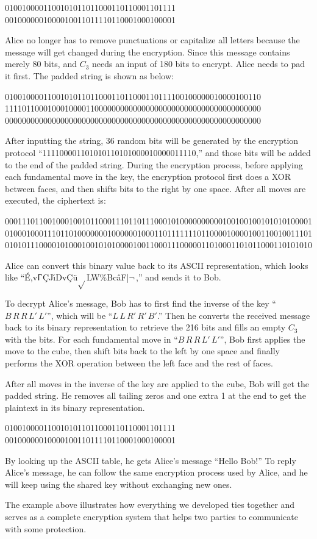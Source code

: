 \begin{center}
    0100100001100101011011000110110001101111 \\
    0010000001000010011011110110001000100001
\end{center}
Alice no longer has to remove punctuations or capitalize all letters because the message will get changed during the encryption. Since this message contains merely 80 bits, and $C_3$ needs an input of 180 bits to encrypt. Alice needs to pad it first. The padded string is shown as below:
\begin{center}
    010010000110010101101100011011000110111100100000010000100110
    111101100010001000011000000000000000000000000000000000000000
    000000000000000000000000000000000000000000000000000000000000
\end{center}
After inputting the string, 36 random bits will be generated by the encryption protocol ``111100001101010110101000010000011110,'' and those bits will be added to the end of the padded string. During the encryption process, before applying each fundamental move in the key, the encryption protocol first does a XOR between faces, and then shifts bits to the right by one space. After all moves are executed, the ciphertext is:
\newpage
\begin{center}
    000111011001000100101100011101101110001010000000000100100100101010100001
    010001000111011010000000100000010001101111111011000010000100110010011101
    010101110000101000100101010000100110001110000011010001101011000110101010
\end{center}
Alice can convert this binary value back to its ASCII representation, which looks like ``\;\'{E},v$\Upgamma$\c{C}\;J\'{\i}Dv\c{C}\"{u}\;$\surd{}$\;L\textyen{}W\;\%Bc\^{a}F|$\neg$\,,'' and sends it to Bob. 
\par To decrypt Alice's message, Bob has to first find the inverse of the key ``$B\,R\,R\,L'\,L'$'', which will be ``$L$\,$L$\,$R'$\,$R'$\,$B'$.'' Then he converts the received message back to its binary representation to retrieve the 216 bits and fills an empty $C_3$ with the bits. For each fundamental move in ``$B\,R\,R\,L'\,L'$'', Bob first applies the move to the cube, then shift bits back to the left by one space and finally performs the XOR operation between the left face and the rest of faces.
\par After all moves in the inverse of the key are applied to the cube, Bob will get the padded string. He removes all tailing zeros and one extra 1 at the end to get the plaintext in its binary representation. 
\begin{center}
    0100100001100101011011000110110001101111 \\
    0010000001000010011011110110001000100001
\end{center}
By looking up the ASCII table, he gets Alice's message ``Hello Bob!'' To reply Alice's message, he can follow the same encryption process used by Alice, and he will keep using the shared key without exchanging new ones.
\par The example above illustrates how everything we developed ties together and serves as a complete encryption system that helps two parties to communicate with some protection.